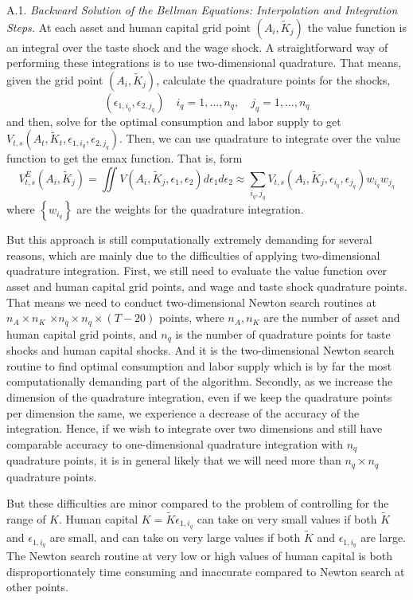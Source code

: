 \documentclass[\econtexRoot/ImaiKeane]{subfiles}
\begin{document}
\label{section:A1}
\quad A.1.      \textit{Backward Solution of the Bellman Equations: Interpolation and Integration Steps.}      At each asset and human capital grid point $\left(A_i, \tilde{K}_j\right)$ the value function is an integral over the taste shock and the wage shock. A straightforward way of performing these integrations is to use two-dimensional quadrature. That means, given the grid point $\left(A_i, \tilde{K}_j\right)$, calculate the quadrature points for the shocks,
$$
\left(\epsilon_{1, i_q}, \epsilon_{2, j_q}\right) \quad i_q=1, \ldots, n_q, \quad j_q=1, \ldots, n_q
$$
and then, solve for the optimal consumption and labor supply to get $V_{t, s}\left(A_t, \tilde{K}_t, \epsilon_{1, i_q}, \epsilon_{2, j_q}\right)$. Then, we can use quadrature to integrate over the value function to get the emax function. That is, form
$$
V_{t, s}^E\left(A_i, \tilde{K}_j\right)=\iint V\left(A_i, \tilde{K}_j, \epsilon_1, \epsilon_2\right) d \epsilon_1 d \epsilon_2 \approx \sum_{i_q, j_q} V_{t, s}\left(A_i, \tilde{K}_j, \epsilon_{i_q}, \epsilon_{j_q}\right) w_{i_q} w_{j_q}
$$
where $\left\{w_{i_q}\right\}$ are the weights for the quadrature integration. \par
But this approach is still computationally extremely demanding for several reasons, which are mainly due to the difficulties of applying two-dimensional quadrature integration. First, we still need to evaluate the value function over asset and human capital grid points, and wage and taste shock quadrature points. That means we need to conduct two-dimensional Newton search routines at $n_A \times n_K$ $\times n_q \times n_q \times(T-20)$ points, where $n_A, n_K$ are the number of asset and human capital grid points, and $n_q$ is the number of quadrature points for taste shocks and human capital shocks. And it is the two-dimensional Newton search routine to find optimal consumption and labor supply which is by far the most computationally demanding part of the algorithm. Secondly, as we increase the dimension of the quadrature integration, even if we keep the quadrature points per dimension the same, we experience a decrease of the accuracy of the integration. Hence, if we wish to integrate over two dimensions and still have comparable accuracy to one-dimensional quadrature integration with $n_q$ quadrature points, it is in general likely that we will need more than $n_q \times n_q$ quadrature points.\par
But these difficulties are minor compared to the problem of controlling for the range of $K$. Human capital $K=\tilde{K} \epsilon_{1, i_q}$ can take on very small values if both $\tilde{K}$ and $\epsilon_{1, i_q}$ are small, and can take on very large values if both $\tilde{K}$ and $\epsilon_{1, i_q}$ are large. The Newton search routine at very low or high values of human capital is both disproportionately time consuming and inaccurate compared to Newton search at other points.\par
\end{document}
